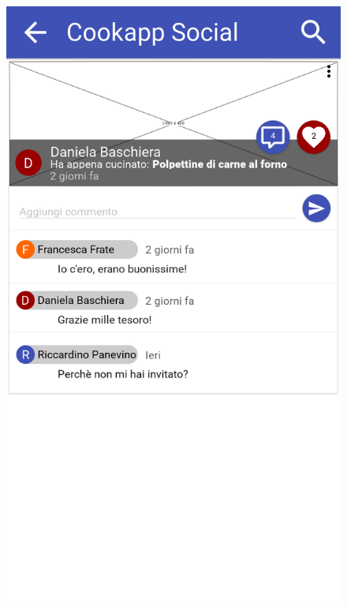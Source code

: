 \begin{figure}[H]
	\begin{minipage}{.49\textwidth}
		\includegraphics[width=\textwidth]{img/wireframe/commenti.png}
	\end{minipage}
	\begin{minipage}{.49\textwidth}

\end{minipage}
\end{figure}
